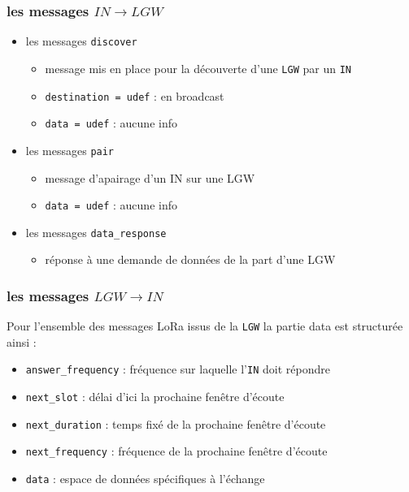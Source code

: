 \documentclass[11pt]{article}
\begin{document}
\subsubsection{les messages $IN \rightarrow LGW$}
\begin{itemize}
    \item les messages \texttt{discover}
    \begin{itemize}
      \item message mis en place pour la découverte d'une \texttt{LGW} par un \texttt{IN}
      \item \texttt{destination = udef} : en broadcast
      \item \texttt{data = udef} : aucune info
    \end{itemize}
    \item les messages \texttt{pair}
    \begin{itemize}
      \item message d'apairage d'un IN sur une LGW
      \item \texttt{data = udef} : aucune info
    \end{itemize}
    \item les messages \texttt{data\_response}
    \begin{itemize}
      \item réponse à une demande de données de la part d'une LGW
    \end{itemize}
\end{itemize}

\subsubsection{les messages $LGW \rightarrow IN$}
Pour l'ensemble des messages LoRa issus de la \texttt{LGW} la partie data est structurée ainsi :

\begin{itemize}
  \item \texttt{answer\_frequency} : fréquence sur laquelle l'\texttt{IN} doit répondre
  \item \texttt{next\_slot} : délai d'ici la prochaine fenêtre d'écoute
  \item \texttt{next\_duration} : temps fixé de la prochaine fenêtre d'écoute
  \item \texttt{next\_frequency} : fréquence de la prochaine fenêtre d'écoute
  \item \texttt{data} : espace de données spécifiques à l'échange
\end{itemize}
\end{document}
